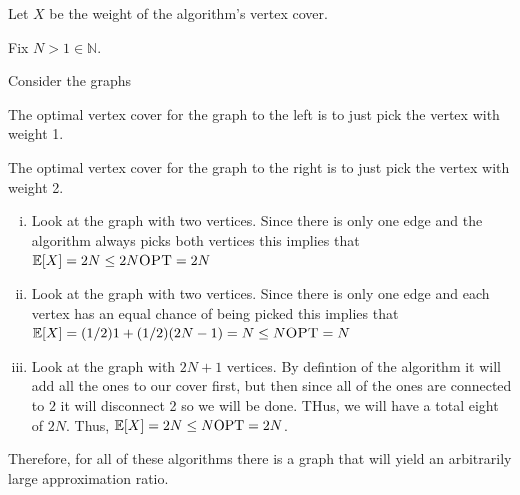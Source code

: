 \documentclass[12pt, letterpaper]{article}
\newcommand{\N}{\mathbb{N}}
\renewcommand{\t}[1]{\text{#1}}
\begin{document}
\begin{problemproof}
  Let $X$ be the weight of the algorithm's vertex cover.

  Fix $N > 1 \in \N$.

  Consider the graphs
  \begin{center}
    
  \end{center}

  The optimal vertex cover for the graph to the left is to just pick the vertex with weight 1.

  The optimal vertex cover for the graph to the right is to just pick the vertex with weight 2.

  \begin{enumerate}[(i)]
    \item Look at the graph with two vertices. Since there is only one edge and the algorithm always picks both vertices this implies that 
    $\mathbb{E}[X]=2N \leq 2N\textsc{OPT}=2N$

    \item Look at the graph with two vertices. Since there is only one edge and each vertex has an equal chance of being picked this implies that $\mathbb{E}[X]=(1/2)1+(1/2)(2N-1)=N \leq N \textsc{OPT}=N$
    
    \item Look at the graph with $2N+1$ vertices. By defintion of the algorithm it will add all the ones to our cover first, but then since all of the ones are connected to $2$ it will disconnect 2 so we will be done. THus, we will have a total eight of $2N$. Thus, $\mathbb{E}[X]=2N \leq N \text{OPT} = 2N$.
  \end{enumerate}

  Therefore, for all of these algorithms there is a graph that will yield an arbitrarily large approximation ratio.
\end{problemproof}
\end{document}

